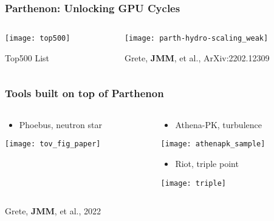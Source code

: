 \documentclass[]{beamer}
\begin{document}
\begin{frame}
  \frametitle{Parthenon: Unlocking GPU Cycles}
  \begin{columns}
    \begin{column}{6cm}
      \begin{center}
        \texttt{[image: top500]}
      \end{center}
      {\footnotesize Top500 List}
    \end{column}
    \begin{column}{6cm}
      \begin{center}
        \texttt{[image: parth-hydro-scaling\_weak]}
      \end{center}
      {\footnotesize Grete, \textbf{JMM}, et al., ArXiv:2202.12309}
    \end{column}
  \end{columns}
\end{frame}

\begin{frame}
  \frametitle{Tools built on top of Parthenon}
  \begin{columns}
    \begin{column}{6cm}
      \begin{itemize}
      \item Phoebus, neutron star
      \end{itemize}
      \begin{center}
        \texttt{[image: tov\_fig\_paper]}
      \end{center}
    \end{column}
    \begin{column}{6cm}
      \begin{itemize}
      \item Athena-PK, turbulence
      \end{itemize}
      \begin{center}
        \texttt{[image: athenapk\_sample]}
      \end{center}
        \begin{itemize}
        \item Riot, triple point
        \end{itemize}
        \begin{center}
          \texttt{[image: triple]}
        \end{center}
    \end{column}
  \end{columns}
  {\footnotesize Grete, \textbf{JMM}, et al., 2022}
\end{frame}
\end{document}
